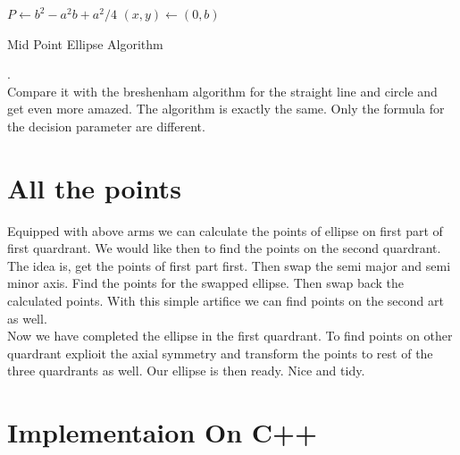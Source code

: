 \documentclass[a4paper,12pt,oneside]{book}
\begin{document}
\begin{algorithm}[H]
		
	\SetAlgoLined
	$P\gets b^2-a^2b+a^2/4$\;
	$(x,y) \gets (0,b)$\;
	\caption{Mid Point Ellipse Algorithm}
\end{algorithm}
.\\[.5cm]
\linebreak
Compare it with the breshenham algorithm for the straight line and circle and get even more amazed. The algorithm is exactly the same. Only the formula for the decision parameter are different.\\

\section{All the points}
Equipped with above arms we can calculate the points of ellipse on first part of first quardrant. We would like then to find the points on the second quardrant. The idea is, get the points of first part first. Then swap the semi major and semi minor axis. Find the points for the swapped ellipse. Then swap back the calculated points. With this simple artifice we can find points on the second art as well. \\
Now we have completed the ellipse in the first quardrant. To find points on other quardrant explioit the axial symmetry and transform the points to rest of the three quardrants as well. Our ellipse is then ready. Nice and tidy.



\section{Implementaion On C++}

\end{document}

